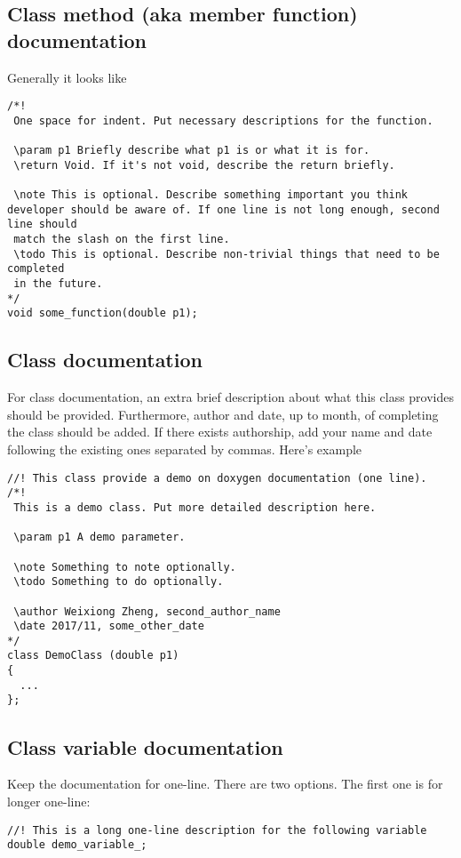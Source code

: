 \documentclass{article}
\begin{document}
\subsection{Class method (aka member function) documentation}
Generally it looks like
\begin{lstlisting}
/*!
 One space for indent. Put necessary descriptions for the function.
 
 \param p1 Briefly describe what p1 is or what it is for.
 \return Void. If it's not void, describe the return briefly.
 
 \note This is optional. Describe something important you think developer should be aware of. If one line is not long enough, second line should
 match the slash on the first line.
 \todo This is optional. Describe non-trivial things that need to be completed 
 in the future.
*/
void some_function(double p1);
\end{lstlisting}

\subsection{Class documentation}
For class documentation, an extra brief description about what this class provides should be provided. Furthermore, author and date, up to month, of completing the class should be added. If there exists authorship, add your name and date following the existing ones separated by commas. Here's example
\begin{lstlisting}
//! This class provide a demo on doxygen documentation (one line).
/*!
 This is a demo class. Put more detailed description here.
 
 \param p1 A demo parameter.
 
 \note Something to note optionally.
 \todo Something to do optionally.
 
 \author Weixiong Zheng, second_author_name
 \date 2017/11, some_other_date
*/
class DemoClass (double p1)
{
  ...
};
\end{lstlisting}

\subsection{Class variable documentation}
Keep the documentation for one-line. There are two options. The first one is for longer one-line:
\begin{lstlisting}
//! This is a long one-line description for the following variable
double demo_variable_;
\end{lstlisting}
\end{document}
